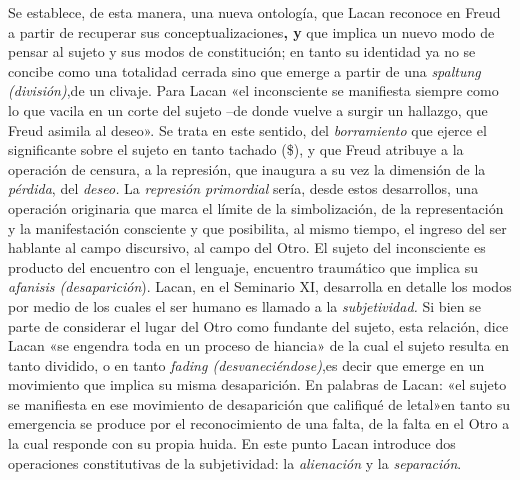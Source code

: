 Se establece, de esta manera, una nueva ontología, que Lacan reconoce en Freud a partir de recuperar sus conceptualizaciones\textbf{, y} que implica un nuevo modo de pensar al sujeto y sus modos de constitución; en tanto su identidad ya no se concibe como una totalidad cerrada sino que emerge a partir de una \emph{spaltung (división)},de un clivaje. Para Lacan «el inconsciente se manifiesta siempre como lo que vacila en un corte del sujeto --de donde vuelve a surgir un hallazgo, que Freud asimila al deseo». Se trata en este sentido, del \emph{borramiento} que ejerce el significante sobre el sujeto en tanto tachado (\$), y que Freud atribuye a la operación de censura, a la represión, que inaugura a su vez la dimensión de la \emph{pérdida}, del \emph{deseo.} La \emph{represión primordial} sería, desde estos desarrollos, una operación originaria que marca el límite de la simbolización, de la representación y la manifestación consciente y que posibilita, al mismo tiempo, el ingreso del ser hablante al campo discursivo, al campo del Otro. El sujeto del inconsciente es producto del encuentro con el lenguaje, encuentro traumático que implica su \emph{afanisis (desaparición}). Lacan, en el Seminario XI, desarrolla en detalle los modos por medio de los cuales el ser humano es llamado a la\emph{ subjetividad. }Si bien se parte de considerar el lugar del Otro como fundante del sujeto, esta relación, dice Lacan «se engendra toda en un proceso de hiancia» de la cual el sujeto resulta en tanto dividido, o en tanto \emph{fading (desvaneciéndose)},es decir que emerge en un movimiento que implica su misma desaparición. En palabras de Lacan: «el sujeto se manifiesta en ese movimiento de desaparición que califiqué de letal»en tanto su emergencia se produce por el reconocimiento de una falta, de la falta en el Otro a la cual responde con su propia huida. En este punto Lacan introduce dos operaciones constitutivas de la subjetividad: la \emph{alienación} y la \emph{separación}.

